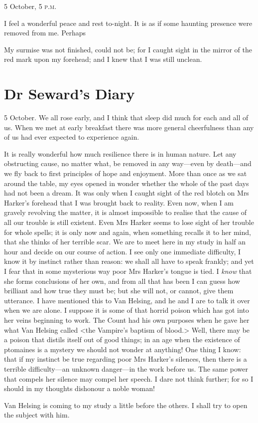 \begin{diary}{5 October, 5 \textsc{p.m.}}
\divider

I feel a wonderful peace and rest to-night. It is as if some haunting presence were removed from me. Perhaps \textellipsis

My surmise was not finished, could not be; for I caught sight in the mirror of the red mark upon my forehead; and I knew that I was still unclean.
\end{diary}

\section{Dr Seward's Diary}

\begin{diary}{5 October.}
We all rose early, and I think that sleep did much for each and all of us. When we met at early breakfast there was more general cheerfulness than any of us had ever expected to experience again.

It is really wonderful how much resilience there is in human nature. Let any obstructing cause, no matter what, be removed in any way—even by death—and we fly back to first principles of hope and enjoyment. More than once as we sat around the table, my eyes opened in wonder whether the whole of the past days had not been a dream. It was only when I caught sight of the red blotch on Mrs Harker's forehead that I was brought back to reality. Even now, when I am gravely revolving the matter, it is almost impossible to realise that the cause of all our trouble is still existent. Even Mrs Harker seems to lose sight of her trouble for whole spells; it is only now and again, when something recalls it to her mind, that she thinks of her terrible scar. We are to meet here in my study in half an hour and decide on our course of action. I see only one immediate difficulty, I know it by instinct rather than reason: we shall all have to speak frankly; and yet I fear that in some mysterious way poor Mrs Harker's tongue is tied. I \textit{know} that she forms conclusions of her own, and from all that has been I can guess how brilliant and how true they must be; but she will not, or cannot, give them utterance. I have mentioned this to Van Helsing, and he and I are to talk it over when we are alone. I suppose it is some of that horrid poison which has got into her veins beginning to work. The Count had his own purposes when he gave her what Van Helsing called <the Vampire's baptism of blood.> Well, there may be a poison that distils itself out of good things; in an age when the existence of ptomaines is a mystery we should not wonder at anything! One thing I know: that if my instinct be true regarding poor Mrs Harker's silences, then there is a terrible difficulty—an unknown danger—in the work before us. The same power that compels her silence may compel her speech. I dare not think further; for so I should in my thoughts dishonour a noble woman!

Van Helsing is coming to my study a little before the others. I shall try to open the subject with him.
\end{diary}
 


